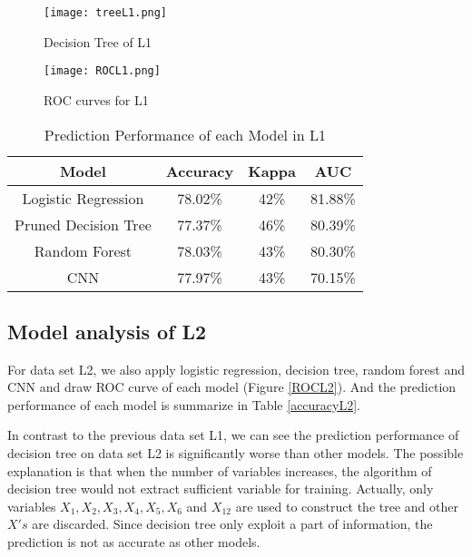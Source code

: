 \documentclass[12pt]{article}
\begin{document}
\begin{figure}[!htb]
\centering
\caption{Decision Tree of L1}
\label{treeL1}
\texttt{[image: treeL1.png]}
\end{figure}
\begin{figure}[!htb]
\centering
\caption{ROC curves for L1}
\label{ROCL1}
\texttt{[image: ROCL1.png]}
\end{figure}
\begin{table}
\centering
\caption{Prediction Performance of each Model in L1}
\label{accuracyL1}
\begin{tabular}{|c|c|c|c|}
\hline
 Model & Accuracy & Kappa & AUC \\
\hline
 Logistic Regression & 78.02\% & 42\% & 81.88\% \\
\hline
 Pruned Decision Tree & 77.37\% & 46\% & 80.39\% \\
\hline
 Random Forest & 78.03\% & 43\% & 80.30\% \\
 \hline
 CNN & 77.97\% & 43\% & 70.15\% \\
\hline
\end{tabular}
\end{table}

\subsection{Model analysis of L2}
For data set L2, we also apply logistic regression, decision tree, random forest and CNN and draw ROC curve of each model (Figure \ref{ROCL2}). And the prediction performance of each model is summarize in Table \ref{accuracyL2}.

In contrast to the previous data set L1, we can see the prediction performance of decision tree on data set L2 is significantly worse than other models. The possible explanation is that when the number of variables increases, the algorithm of decision tree would not extract sufficient variable for training. Actually, only variables $X_1, X_2, X_3, X_4, X_5, X_6$ and $X_{12}$ are used to construct the tree and other $X's$ are discarded. Since decision tree only exploit a part of information, the prediction is not as accurate as other models.
\end{document}
